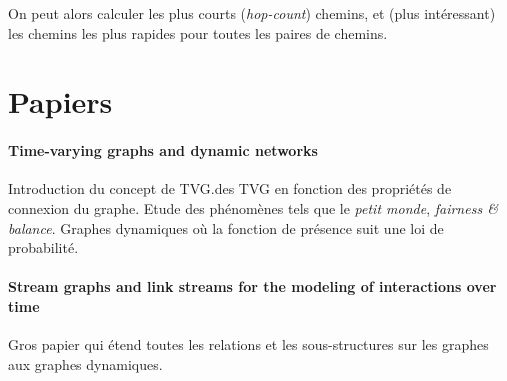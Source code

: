 \documentclass[11pt,a4paper]{article}
\begin{document}
On peut alors calculer les plus courts (\textit{hop-count}) chemins,
et (plus intéressant) les chemins les plus rapides pour toutes les
paires de chemins.

\section{Papiers}

\paragraph{Time-varying graphs and dynamic networks}
Introduction du concept de TVG.\@Classification des TVG en fonction
des propriétés de connexion du graphe. Etude des phénomènes tels que
le \textit{petit monde}, \textit{fairness \& balance}. Graphes
dynamiques où la fonction de présence suit une loi de probabilité.

\paragraph{Stream graphs and link streams for the modeling of
  interactions over time}
Gros papier qui étend toutes les relations et les sous-structures sur
les graphes aux graphes dynamiques.



\end{document}
